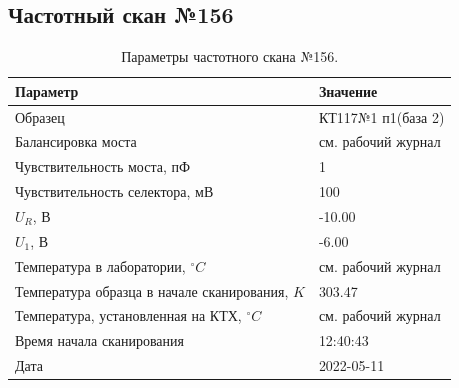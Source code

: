\subsection{Частотный скан №156}
\begin{table}[!ht]
    \centering
    \caption{Параметры частотного скана №156.}
    \begin{tabular}{|l|l|}
        \hline
        Параметр                                       & Значение                  \\ \hline
        Образец                                        & КТ117№1 п1(база 2)        \\ \hline
        Балансировка моста                             & см. рабочий журнал        \\ \hline
        Чувствительность моста, пФ                     & 1                         \\ \hline
        Чувствительность селектора, мВ                 & 100                       \\ \hline
        $U_R$, В                                       & -10.00                    \\ \hline
        $U_1$, В                                       & -6.00                     \\ \hline
        Температура в лаборатории, $^\circ C$          & см. рабочий журнал        \\ \hline
        Температура образца в начале сканирования, $K$ & 303.47                    \\ \hline
        Температура, установленная на КТХ, $^\circ C$  & см. рабочий журнал        \\ \hline
        Время начала сканирования                      & 12:40:43                  \\ \hline
        Дата                                           & 2022-05-11                \\ \hline
    \end{tabular}
    \label{table:frequency_scan_156}
\end{table}

